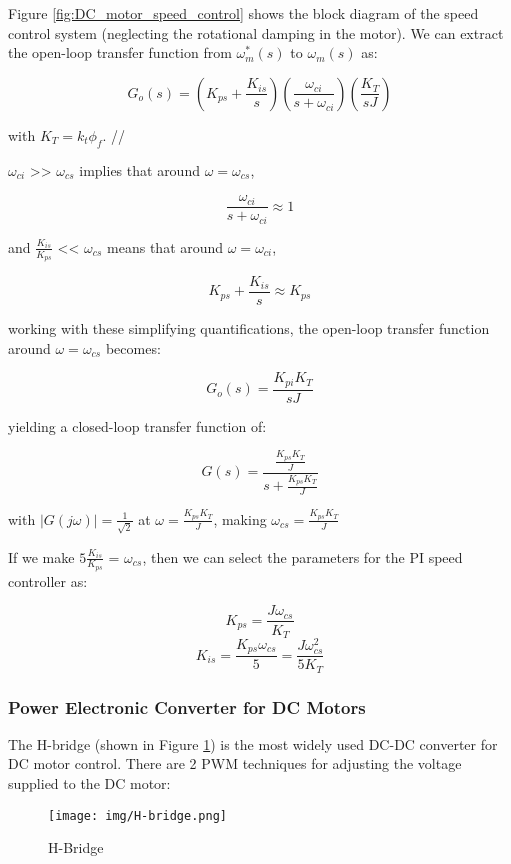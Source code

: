 \documentclass[a4paper]{article}
\begin{document}
Figure \ref{fig:DC_motor_speed_control} shows the block diagram of the speed control system (neglecting the rotational damping in the motor). 
We can extract the open-loop transfer function from $\omega_{m}^{*}(s)$ to $\omega_{m}(s)$ as: 

$$ G_{o}(s)= \left( K_{ps} + \frac{K_{is}}{s} \right) \left( \frac{\omega_{ci}}{s + \omega_{ci}} \right)  
                \left( \frac{K_{T}}{s J} \right) $$

with $K_{T}= k_{t} \phi_{f}$.
//

$\omega_{ci}$ >> $\omega_{cs}$ implies that around $\omega= \omega_{cs}$, 

$$ \frac{\omega_{ci}}{s + \omega_{ci}} \approx 1 $$

and $\frac{K_{is}}{K_{ps}}$ << $\omega_{cs}$ means that around $\omega= \omega_{ci}$,

$$ K_{ps} + \frac{K_{is}}{s} \approx K_{ps} $$

working with these simplifying quantifications, the open-loop transfer function around $\omega= \omega_{cs}$ becomes:

$$ G_{o}(s)= \frac{ K_{pi} K_{T}}{s J} $$

yielding a closed-loop transfer function of: 

$$ G(s)= \frac{ \frac{K_{ps} K_{T}}{J} }{ s + \frac{K_{ps} K_{T}}{J} } $$

with $\left| G(j\omega) \right|= \frac{1}{\sqrt{2}}$ at $\omega= \frac{K_{ps} K_{T}}{J}$, 
making $\omega_{cs}= \frac{K_{ps} K_{T}}{J}$

If we make $5 \frac{K_{is}}{K_{ps}}$ = $\omega_{cs}$, then we can select the parameters for the PI speed controller as:

$$ K_{ps}= \frac{J \omega_{cs}}{K_{T}} $$
$$ K_{is}= \frac{K_{ps} \omega_{cs}}{5}= \frac{J \omega_{cs}^{2}}{5 K_{T}} $$


\subsubsection{Power Electronic Converter for DC Motors}

The H-bridge (shown in Figure \ref{fig:H_Bridge}) is the most widely used DC-DC converter for DC motor control. 
There are 2 PWM techniques for adjusting the voltage supplied to the DC motor:

\begin{figure}
        \centering
        \texttt{[image: img/H-bridge.png]}
        \caption{H-Bridge \cite{kim17}}
        \label{fig:H_Bridge}
\end{figure}
\end{document}
